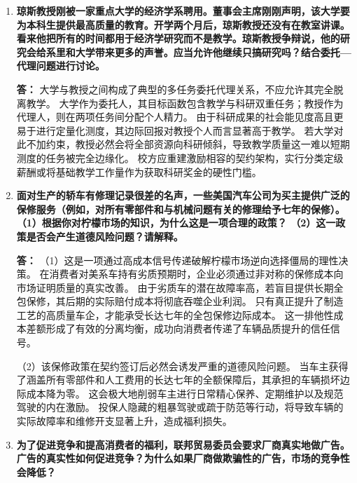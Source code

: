 \begin{enumerate}[label=\textbf{\arabic*.}, leftmargin=*]
		\textbf{答：} 从经济学激励逻辑来看，这是一项注定会引发严重道德风险的错误政策。
		禁止给低分在本质上割裂了学生的学习努力与绩效惩罚之间的因果反馈。
		当不及格的下限风险被校方人为移除后，学生付出学习努力的边际成本相对上升，而偷懒的边际机会成本降为零。
		这会导致原本处于及格线边缘的学生产生隐藏行动，降低日常时间投入，引发普遍的隐性偷懒行为。
		该政策不仅无法将整体能力提升至优秀水平，反而会因激励兼容机制的丧失导致教育质量的整体滑坡。
		
		\item \textbf{琼斯教授刚被一家重点大学的经济学系聘用。董事会主席刚刚声明，该大学要为本科生提供最高质量的教育。开学两个月后，琼斯教授还没有在教室讲课。看来他把所有的时间都用于经济学研究而不是教学。琼斯教授争辩说，他的研究会给系里和大学带来更多的声誉。应当允许他继续只搞研究吗？结合委托—代理问题进行讨论。}
		
		\textbf{答：} 大学与教授之间构成了典型的多任务委托代理关系，不应允许其完全脱离教学。
		大学作为委托人，其目标函数包含教学与科研双重任务；教授作为代理人，则在两项任务间分配个人精力。
		由于科研成果的社会能见度高且更易于进行定量化测度，其边际回报对教授个人而言显著高于教学。
		若大学对此不加约束，教授必然会将全部资源向科研倾斜，导致教学质量这一难以短期测度的任务被完全边缘化。
		校方应重建激励相容的契约架构，实行分类定级薪酬或将基础教学工作量作为获取科研奖金的硬性门槛。
		
		\item \textbf{面对生产的轿车有修理记录很差的名声，一些美国汽车公司为买主提供广泛的保修服务（例如，对所有零部件和与机械问题有关的修理给予七年的保修）。
			（1）根据你对柠檬市场的知识，为什么这是一项合理的政策？
			（2）这一政策是否会产生道德风险问题？请解释。}
		
		\textbf{答：} （1）这是一项通过高成本信号传递破解柠檬市场逆向选择僵局的理性决策。
		在消费者对美系车持有劣质预期时，企业必须通过非对称的保修成本向市场证明质量的真实改善。
		由于劣质车的潜在故障率高，若盲目提供长期全包保修，其后期的实际赔付成本将彻底吞噬企业利润。
		只有真正提升了制造工艺的高质量车企，才能承受长达七年的全包保修边际成本。
		这一排他性成本差额形成了有效的分离均衡，成功向消费者传递了车辆品质提升的信任信号。
		
		（2）该保修政策在契约签订后必然会诱发严重的道德风险问题。
		当车主获得了涵盖所有零部件和人工费用的长达七年的全额保障后，其承担的车辆损坏边际成本降为零。
		这会极大地削弱车主进行日常精心保养、定期维护以及规范驾驶的内在激励。
		投保人隐藏的粗暴驾驶或疏于防范等行动，将导致车辆的实际故障率和维修开支显著上升，造成福利损失。
		
		\item \textbf{为了促进竞争和提高消费者的福利，联邦贸易委员会要求厂商真实地做广告。广告的真实性如何促进竞争？为什么如果厂商做欺骗性的广告，市场的竞争性会降低？}
		

\end{enumerate}

